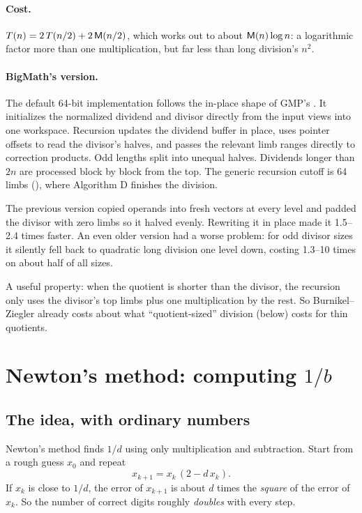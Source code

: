 \paragraph{Cost.} $T(n) = 2\,T(n/2) + 2\,\mathsf{M}(n/2)$, which works out to about $\mathsf{M}(n) \log n$: a
logarithmic factor more than one multiplication, but far less than long division's $n^2$.

\paragraph{BigMath's version.} The default 64-bit implementation follows the in-place
shape of GMP's . It initializes the normalized dividend and
divisor directly from the input views into one workspace. Recursion updates the
dividend buffer in place, uses pointer offsets to read the divisor's halves, and
passes the relevant limb ranges directly to correction products. Odd lengths split
into unequal halves. Dividends longer than $2n$ are processed block by block from the top.
The generic recursion cutoff is 64 limbs (), where
Algorithm D finishes the division.

\begin{pitfall}
The previous version copied operands into fresh vectors at every level and padded the divisor
with zero limbs so it halved evenly. Rewriting it in place made it 1.5--2.4 times faster. An
even older version had a worse problem: for odd divisor sizes it silently fell back to
quadratic long division one level down, costing 1.3--10 times on about half of all sizes.
\end{pitfall}

A useful property: when the quotient is shorter than the divisor, the recursion only uses
the divisor's top limbs plus one multiplication by the rest. So Burnikel--Ziegler already
costs about what ``quotient-sized'' division (below) costs for thin quotients.

\section{Newton's method: computing $1/b$}
\label{sec:newton}

\subsection{The idea, with ordinary numbers}

Newton's method finds $1/d$ using only multiplication and subtraction. Start from a rough
guess $x_0$ and repeat
\[
x_{k+1} = x_k \,(2 - d\, x_k) .
\]
If $x_k$ is close to $1/d$, the error of $x_{k+1}$ is about $d$ times the \emph{square} of the
error of $x_k$. So the number of correct digits roughly \emph{doubles} with every step.

